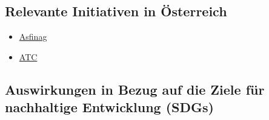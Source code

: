 \documentclass[
]{book}
\providecommand{\tightlist}{%
  \setlength{\itemsep}{0pt}\setlength{\parskip}{0pt}}
\begin{document}
\hypertarget{relevante-initiativen-in-uxf6sterreich-15}{%
\subsection*{Relevante Initiativen in Österreich}\label{relevante-initiativen-in-uxf6sterreich-15}}

\begin{itemize}
\tightlist
\item
  \href{https://www.asfinag.at/road-safety/traffic-management/traffic-control/}{Asfinag}
\item
  \href{https://www.atc.or.at/smart-cities/smart-mobility/urban-traffic-management-solutions/}{ATC}
\end{itemize}

\hypertarget{auswirkungen-in-bezug-auf-die-ziele-fuxfcr-nachhaltige-entwicklung-sdgs-15}{%
\subsection*{Auswirkungen in Bezug auf die Ziele für nachhaltige Entwicklung (SDGs)}\label{auswirkungen-in-bezug-auf-die-ziele-fuxfcr-nachhaltige-entwicklung-sdgs-15}}
\end{document}
